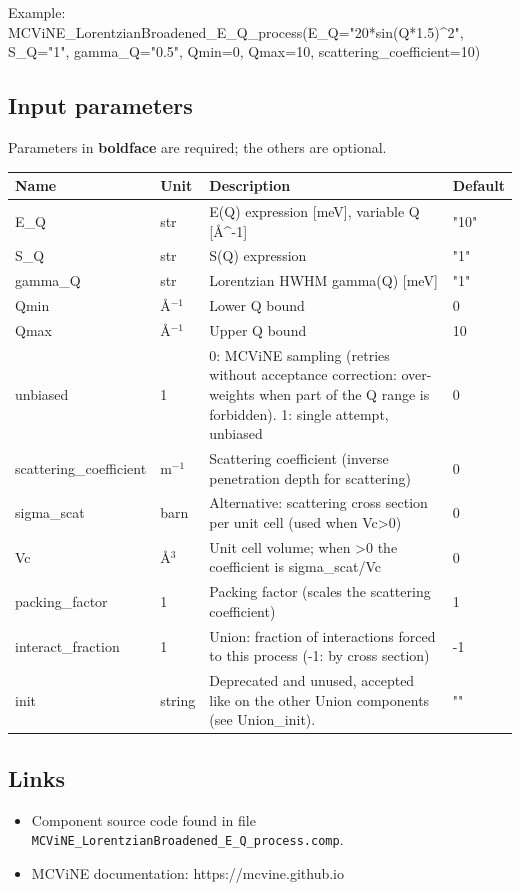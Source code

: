 Example: MCViNE\_LorentzianBroadened\_E\_Q\_process(E\_Q="20*sin(Q*1.5)\textasciicircum{}2", S\_Q="1", gamma\_Q="0.5", Qmin=0, Qmax=10, scattering\_coefficient=10)

\subsection*{Input parameters}
Parameters in \textbf{boldface} are required; the others are optional.

\begin{longtable}{p{}p{}p{}p{}}
\toprule
\textbf{Name} & \textbf{Unit} & \textbf{Description} & \textbf{Default} \\
\midrule
\endhead
E\_Q & str & E(Q) expression [meV], variable Q [\AA{}\textasciicircum{}-1] & "10" \\
S\_Q & str & S(Q) expression & "1" \\
gamma\_Q & str & Lorentzian HWHM gamma(Q) [meV] & "1" \\
Qmin & \AA{}$^{-1}$ & Lower Q bound & 0 \\
Qmax & \AA{}$^{-1}$ & Upper Q bound & 10 \\
unbiased & 1 & 0: MCViNE sampling (retries without acceptance correction: over-weights when part of the Q range is forbidden). 1: single attempt, unbiased & 0 \\
scattering\_coefficient & m$^{-1}$ & Scattering coefficient (inverse penetration depth for scattering) & 0 \\
sigma\_scat & barn & Alternative: scattering cross section per unit cell (used when Vc\textgreater{}0) & 0 \\
Vc & \AA{}$^{3}$ & Unit cell volume; when \textgreater{}0 the coefficient is sigma\_scat/Vc & 0 \\
packing\_factor & 1 & Packing factor (scales the scattering coefficient) & 1 \\
interact\_fraction & 1 & Union: fraction of interactions forced to this process (-1: by cross section) & -1 \\
init & string & Deprecated and unused, accepted like on the other Union components (see Union\_init). & "" \\
\bottomrule
\end{longtable}

\subsection*{Links}
\begin{itemize}
  \item Component source code found in file \texttt{MCViNE\_LorentzianBroadened\_E\_Q\_process.comp}.
  \item MCViNE documentation: https://mcvine.github.io
\end{itemize}
